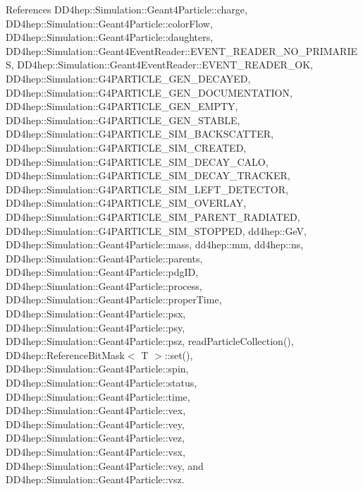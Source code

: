 References D\+D4hep\+::\+Simulation\+::\+Geant4\+Particle\+::charge, D\+D4hep\+::\+Simulation\+::\+Geant4\+Particle\+::color\+Flow, D\+D4hep\+::\+Simulation\+::\+Geant4\+Particle\+::daughters, D\+D4hep\+::\+Simulation\+::\+Geant4\+Event\+Reader\+::\+E\+V\+E\+N\+T\+\_\+\+R\+E\+A\+D\+E\+R\+\_\+\+N\+O\+\_\+\+P\+R\+I\+M\+A\+R\+I\+ES, D\+D4hep\+::\+Simulation\+::\+Geant4\+Event\+Reader\+::\+E\+V\+E\+N\+T\+\_\+\+R\+E\+A\+D\+E\+R\+\_\+\+OK, D\+D4hep\+::\+Simulation\+::\+G4\+P\+A\+R\+T\+I\+C\+L\+E\+\_\+\+G\+E\+N\+\_\+\+D\+E\+C\+A\+Y\+ED, D\+D4hep\+::\+Simulation\+::\+G4\+P\+A\+R\+T\+I\+C\+L\+E\+\_\+\+G\+E\+N\+\_\+\+D\+O\+C\+U\+M\+E\+N\+T\+A\+T\+I\+ON, D\+D4hep\+::\+Simulation\+::\+G4\+P\+A\+R\+T\+I\+C\+L\+E\+\_\+\+G\+E\+N\+\_\+\+E\+M\+P\+TY, D\+D4hep\+::\+Simulation\+::\+G4\+P\+A\+R\+T\+I\+C\+L\+E\+\_\+\+G\+E\+N\+\_\+\+S\+T\+A\+B\+LE, D\+D4hep\+::\+Simulation\+::\+G4\+P\+A\+R\+T\+I\+C\+L\+E\+\_\+\+S\+I\+M\+\_\+\+B\+A\+C\+K\+S\+C\+A\+T\+T\+ER, D\+D4hep\+::\+Simulation\+::\+G4\+P\+A\+R\+T\+I\+C\+L\+E\+\_\+\+S\+I\+M\+\_\+\+C\+R\+E\+A\+T\+ED, D\+D4hep\+::\+Simulation\+::\+G4\+P\+A\+R\+T\+I\+C\+L\+E\+\_\+\+S\+I\+M\+\_\+\+D\+E\+C\+A\+Y\+\_\+\+C\+A\+LO, D\+D4hep\+::\+Simulation\+::\+G4\+P\+A\+R\+T\+I\+C\+L\+E\+\_\+\+S\+I\+M\+\_\+\+D\+E\+C\+A\+Y\+\_\+\+T\+R\+A\+C\+K\+ER, D\+D4hep\+::\+Simulation\+::\+G4\+P\+A\+R\+T\+I\+C\+L\+E\+\_\+\+S\+I\+M\+\_\+\+L\+E\+F\+T\+\_\+\+D\+E\+T\+E\+C\+T\+OR, D\+D4hep\+::\+Simulation\+::\+G4\+P\+A\+R\+T\+I\+C\+L\+E\+\_\+\+S\+I\+M\+\_\+\+O\+V\+E\+R\+L\+AY, D\+D4hep\+::\+Simulation\+::\+G4\+P\+A\+R\+T\+I\+C\+L\+E\+\_\+\+S\+I\+M\+\_\+\+P\+A\+R\+E\+N\+T\+\_\+\+R\+A\+D\+I\+A\+T\+ED, D\+D4hep\+::\+Simulation\+::\+G4\+P\+A\+R\+T\+I\+C\+L\+E\+\_\+\+S\+I\+M\+\_\+\+S\+T\+O\+P\+P\+ED, dd4hep\+::\+GeV, D\+D4hep\+::\+Simulation\+::\+Geant4\+Particle\+::mass, dd4hep\+::mm, dd4hep\+::ns, D\+D4hep\+::\+Simulation\+::\+Geant4\+Particle\+::parents, D\+D4hep\+::\+Simulation\+::\+Geant4\+Particle\+::pdg\+ID, D\+D4hep\+::\+Simulation\+::\+Geant4\+Particle\+::process, D\+D4hep\+::\+Simulation\+::\+Geant4\+Particle\+::proper\+Time, D\+D4hep\+::\+Simulation\+::\+Geant4\+Particle\+::psx, D\+D4hep\+::\+Simulation\+::\+Geant4\+Particle\+::psy, D\+D4hep\+::\+Simulation\+::\+Geant4\+Particle\+::psz, read\+Particle\+Collection(), D\+D4hep\+::\+Reference\+Bit\+Mask$<$ T $>$\+::set(), D\+D4hep\+::\+Simulation\+::\+Geant4\+Particle\+::spin, D\+D4hep\+::\+Simulation\+::\+Geant4\+Particle\+::status, D\+D4hep\+::\+Simulation\+::\+Geant4\+Particle\+::time, D\+D4hep\+::\+Simulation\+::\+Geant4\+Particle\+::vex, D\+D4hep\+::\+Simulation\+::\+Geant4\+Particle\+::vey, D\+D4hep\+::\+Simulation\+::\+Geant4\+Particle\+::vez, D\+D4hep\+::\+Simulation\+::\+Geant4\+Particle\+::vsx, D\+D4hep\+::\+Simulation\+::\+Geant4\+Particle\+::vsy, and D\+D4hep\+::\+Simulation\+::\+Geant4\+Particle\+::vsz.




